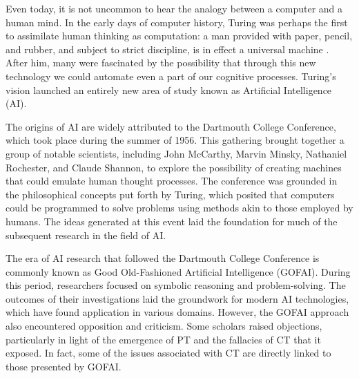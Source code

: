 Even today, it is not uncommon to hear the analogy between a computer and a human mind. In the early days of computer history, Turing was perhaps the first to assimilate human thinking as computation: a man provided with paper, pencil, and rubber, and subject to strict discipline, is in effect a universal machine \citep{Turing1937}. After him, many were fascinated by the possibility that through this new technology we could automate even a part of our cognitive processes. Turing's vision launched an entirely new area of study known as Artificial Intelligence (AI).

The origins of AI are widely attributed to the Dartmouth College Conference, which took place during the summer of 1956. This gathering brought together a group of notable scientists, including John McCarthy, Marvin Minsky, Nathaniel Rochester, and Claude Shannon, to explore the possibility of creating machines that could emulate human thought processes. The conference was grounded in the philosophical concepts put forth by Turing, which posited that computers could be programmed to solve problems using methods akin to those employed by humans. The ideas generated at this event laid the foundation for much of the subsequent research in the field of AI.

The era of AI research that followed the Dartmouth College Conference is commonly known as Good Old-Fashioned Artificial Intelligence (GOFAI). During this period, researchers focused on symbolic reasoning and problem-solving. The outcomes of their investigations laid the groundwork for modern AI technologies, which have found application in various domains. However, the GOFAI approach also encountered opposition and criticism. Some scholars raised objections, particularly in light of the emergence of PT and the fallacies of CT that it exposed. In fact, some of the issues associated with CT are directly linked to those presented by GOFAI.
 
